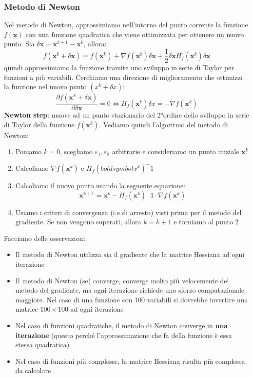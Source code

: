 \documentclass[12pt]{article}
\begin{document}
\subsubsection{Metodo di Newton}
Nel metodo di Newton, approssimiamo nell'intorno del punto corrente la funzione $f(\boldsymbol{x})$ con una funzione quadratica che viene ottimizzata per ottenere un nuovo punto. Sia $\delta \boldsymbol{x} = \boldsymbol{x}^{k+1} - \boldsymbol{x}^k$, allora:
$$f(\boldsymbol{x}^k + \delta \boldsymbol{x}) = f(\boldsymbol{x}^k) + \nabla f(\boldsymbol{x}^k)\delta \boldsymbol{x} + \frac{1}{2}\delta \boldsymbol{x} H_f(\boldsymbol{x}^k)\delta \boldsymbol{x}$$
quindi approssimiamo la funzione tramite uno sviluppo in serie di Taylor per funzioni a più variabili. \newline
Cerchiamo una direzione di miglioramento che ottimizzi la funzione nel nuovo punto $(x^k + \delta x)$:
$$\frac{\partial f(\boldsymbol{x}^k + \delta \boldsymbol{x})}{\partial \delta \boldsymbol{x}} = 0 \Leftrightarrow H_f(\boldsymbol{x}^k)\delta x = -\nabla f(\boldsymbol{x}^k)$$
\textbf{Newton step}: muove ad un punto stazionario del 2°ordine dello sviluppo in serie di Taylor della funzione $f(\boldsymbol{x}^k)$.
Vediamo quindi l'algoritmo del metodo di Newton:
\begin{enumerate}
    \item Poniamo $k = 0$, scegliamo $\varepsilon_1, \varepsilon_2$ arbitrarie e consideriamo un punto iniziale $\boldsymbol{x}^k$
    \item Calcoliamo $\nabla f(\boldsymbol{x}^k)$ e $H_f(boldsymbol{x}^k)^-1$
    \item Calcoliamo il nuovo punto usando la seguente equazione: $$\boldsymbol{x}^{k+1} = \boldsymbol{x}^k - H_f(\boldsymbol{x}^k)^-1 \cdot \nabla f(\boldsymbol{x}^k)$$
    \item Usiamo i criteri di convergenza (i.e di arresto) visti prima per il metodo del gradiente. Se non vengono superati, allora $k = k+1$ e torniamo al punto 2
\end{enumerate}
Facciamo delle osservazioni:
\begin{itemize}
    \item Il metodo di Newton utilizza sia il gradiente che la matrice Hessiana ad ogni iterazione
    \item Il metodo di Newton (se) converge, converge molto più velocemente del metodo del gradiente, ma ogni iterazione richiede uno sforzo computazionale maggiore. Nel caso di una funzione con 100 variabili si dovrebbe invertire una matrice $100 \times 100$ ad ogni iterazione
    \item Nel caso di funzioni quadratiche, il metodo di Newton converge in \textbf{una iterazione} (questo perché l'approssimazione che fa della funzione è essa stessa quadratica)
    \item Nel caso di funzioni più complesse, la matrice Hessiana risulta più complessa da calcolare
\end{itemize}
\end{document}
